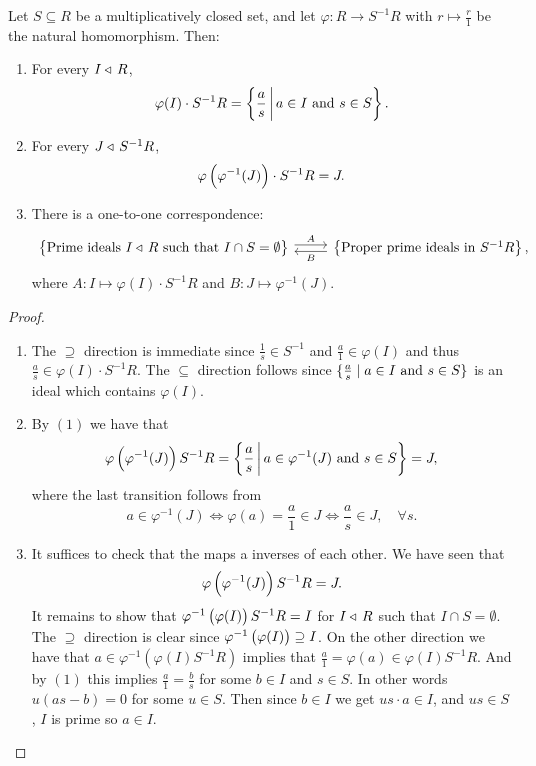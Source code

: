 \documentclass[11pt,a4paper]{article}
\begin{document}
\begin{proposition}
  Let $S \subseteq R$ be a multiplicatively closed set,
  and let $\varphi \colon R \to S^{-1}R$ with $r \mapsto \frac{r}{1}$
  be the natural homomorphism.
  Then:
  \begin{enumerate}
    \item[(1)] For every $I \triangleleft\, R$,
      \[
        \varphi(I) \cdot S^{-1}R =
        \left\{\frac{a}{s} \,\middle\vert\, a \in I \text{ and } s \in S\right\}.
      \]
    \item[(2)] For every $J \triangleleft\, S^{-1}R$,
      \[
        \varphi\del{\varphi^{-1}(J)} \cdot S^{-1}R = J.
      \]
    \item[(3)] There is a one-to-one correspondence:
        \[
        \begin{tikzcd}
          \set{
          \text{Prime ideals $I \idealin R$ such that $I \cap S = \emptyset$}}
          \arrow[r, shift left, "A"] &
          \set{\text{Proper prime ideals in $S^{-1}R$}}
          \arrow[l, shift left, "B"],
        \end{tikzcd}
        \]
      where $A \colon I \mapsto \varphi(I) \cdot S^{-1}R$
      and $B \colon J \mapsto \varphi^{-1}(J)$.
  \end{enumerate}
\end{proposition}
\begin{proof} \phantom{}
  \begin{enumerate}
    \item[(1)] The $\supseteq$ direction is
      immediate since $\frac{1}{s} \in S^{-1}$ and $\frac{a}{1} \in \varphi(I)$
      and thus $\frac{a}{s} \in \varphi(I) \cdot S^{-1}R$.
      The $\subseteq$ direction follows since
      $\{\frac{a}{s} \mid a \in I \text{ and } s \in S\}$ is an ideal
      which contains $\varphi(I)$.
    \item[(2)] By $(1)$ we have that
      \[
        \varphi\del{\varphi^{-1}(J)}S^{-1}R =
        \set{\frac{a}{s} \bmid a \in \varphi^{-1}(J) \stand s \in S} =
        J,
      \]
      where the last transition follows from
      \[
        a \in \varphi^{-1}(J) \iff
        \varphi(a) = \frac{a}{1} \in J \iff
        \frac{a}{s} \in J, \quad \forall s.
      \]
    \item[(3)] It suffices to check that the maps a inverses
      of each other.
      We have seen that
      \[
        \varphi\del{\varphi^{-1}(J)}S^{-1}R = J.
      \]
      It remains to show that $\varphi^{-1}\del{\varphi(I)}S^{-1}R = I$
      for $I \triangleleft\, R$ such that $I \cap S = \emptyset$.
      The $\supseteq$ direction is clear since
      $\varphi^{-1}\del{\varphi(I)} \supseteq I$.
      On the other direction we have that
      $a \in \varphi^{-1}(\varphi(I) S^{-1}R)$ implies that
      $\frac{a}{1} = \varphi(a) \in \varphi(I) S^{-1}R$.
      And by $(1)$ this implies $\frac{a}{1} = \frac{b}{s}$
      for some $b \in I$ and $s \in S$.
      In other words $u(as - b) = 0$ for some $u \in S$.
      Then since $b \in I$ we get $us \cdot a \in I$,
      and $us \in S$, $I$ is prime so $a \in I$.
  \end{enumerate}
\end{proof}
\end{document}
